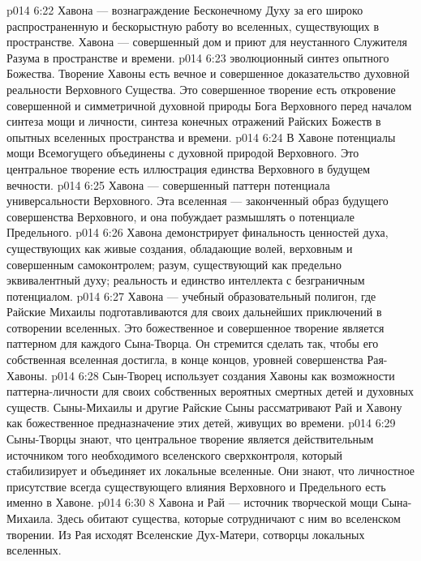 \vs p014 6:22 Хавона --- вознаграждение Бесконечному Духу за его широко распространенную и бескорыстную работу во вселенных, существующих в пространстве. Хавона --- совершенный дом и приют для неустанного Служителя Разума в пространстве и времени.
\vs p014 6:23 \bibnobreakspace {} эволюционный синтез опытного Божества. Творение Хавоны есть вечное и совершенное доказательство духовной реальности Верховного Существа. Это совершенное творение есть откровение совершенной и симметричной духовной природы Бога Верховного перед началом синтеза мощи и личности, синтеза конечных отражений Райских Божеств в опытных вселенных пространства и времени.
\vs p014 6:24 В Хавоне потенциалы мощи Всемогущего объединены с духовной природой Верховного. Это центральное творение есть иллюстрация единства Верховного в будущем вечности.
\vs p014 6:25 Хавона --- совершенный паттерн потенциала универсальности Верховного. Эта вселенная --- законченный образ будущего совершенства Верховного, и она побуждает размышлять о потенциале Предельного.
\vs p014 6:26 Хавона демонстрирует финальность ценностей духа, существующих как живые создания, обладающие волей, верховным и совершенным самоконтролем; разум, существующий как предельно эквивалентный духу; реальность и единство интеллекта с безграничным потенциалом.
\vs p014 6:27 \bibnobreakspace {} Хавона --- учебный образовательный полигон, где Райские Михаилы подготавливаются для своих дальнейших приключений в сотворении вселенных. Это божественное и совершенное творение является паттерном для каждого Сына\hyp{}Творца. Он стремится сделать так, чтобы его собственная вселенная достигла, в конце концов, уровней совершенства Рая\hyp{}Хавоны.
\vs p014 6:28 Сын\hyp{}Творец использует создания Хавоны как возможности паттерна\hyp{}личности для своих собственных вероятных смертных детей и духовных существ. Сыны\hyp{}Михаилы и другие Райские Сыны рассматривают Рай и Хавону как божественное предназначение этих детей, живущих во времени.
\vs p014 6:29 Сыны\hyp{}Творцы знают, что центральное творение является действительным источником того необходимого вселенского сверхконтроля, который стабилизирует и объединяет их локальные вселенные. Они знают, что личностное присутствие всегда существующего влияния Верховного и Предельного есть именно в Хавоне.
\vs p014 6:30 8 Хавона и Рай --- источник творческой мощи Сына\hyp{}Михаила. Здесь обитают существа, которые сотрудничают с ним во вселенском творении. Из Рая исходят Вселенские Дух\hyp{}Матери, сотворцы локальных вселенных.
